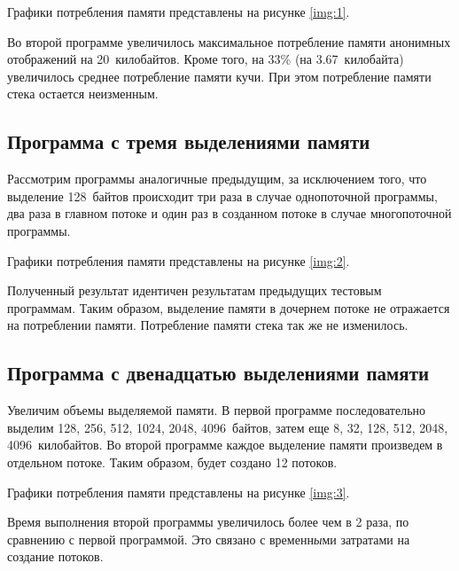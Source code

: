 



Графики потребления памяти представлены на рисунке \ref{img:1}.

Во второй программе увеличилось максимальное потребление памяти анонимных отображений на 20~килобайтов. Кроме того, на 33\% (на 3.67~килобайта) увеличилось среднее потребление памяти кучи. При этом потребление памяти стека остается неизменным.


\subsection{Программа с тремя выделениями памяти}

Рассмотрим программы аналогичные предыдущим, за исключением того, что выделение 128~байтов происходит три раза в случае однопоточной программы, два раза в главном потоке и один раз в созданном потоке в случае многопоточной программы.

Графики потребления памяти представлены на рисунке \ref{img:2}.


Полученный результат идентичен результатам предыдущих тестовым программам. Таким образом, выделение памяти в дочернем потоке не отражается на потреблении памяти. Потребление памяти стека так же не изменилось.

\subsection{Программа с двенадцатью выделениями памяти}

Увеличим объемы выделяемой памяти. В первой программе последовательно выделим 128, 256, 512, 1024, 2048, 4096~байтов, затем еще 8, 32, 128, 512, 2048, 4096~килобайтов. Во второй программе каждое выделение памяти произведем в отдельном потоке. Таким образом, будет создано 12 потоков.

Графики потребления памяти представлены на рисунке \ref{img:3}.

Время выполнения второй программы увеличилось более чем в 2 раза, по сравнению с первой программой. Это связано с временн\textit{ы}ми затратами на создание потоков.

